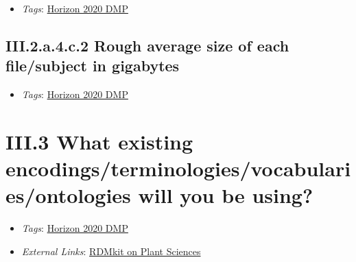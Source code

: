 \documentclass[a4paper,12pt]{report}
\begin{document}
\begin{itemize}
  \item \textit{Tags}: \ul{Horizon 2020 DMP}
  \end{itemize}




\subsection*{\protect\textcolor{colorSecId}{III.2.a.4.c.2} Rough average size of each file/subject in gigabytes}

\label{b1df3c74-0b1f-4574-81c4-4cc2d780c1af.b08fe063-33f8-4380-b3a9-ba1e586dedf2.df7ff410-748e-4704-b5b4-a06c4b269047.ba9e42fc-2bf5-413f-85de-003f981aaf81.24dbd191-2d0c-4267-b858-d9063b21a486.624cfadf-6177-47b7-9ba8-b80b68aef0fd}


\begin{itemize}
  \item \textit{Tags}: \ul{Horizon 2020 DMP}
  \end{itemize}








\section*{\protect\textcolor{colorSecId}{III.3} What existing encodings/terminologies/vocabularies/ontologies will you be using?}

\label{b1df3c74-0b1f-4574-81c4-4cc2d780c1af.2bac9020-99cf-4463-8d34-0b0eb2781cd1}


\begin{itemize}
  \item \textit{Tags}: \ul{Horizon 2020 DMP}
  
  \item \textit{External Links}: \href{https://rdmkit.elixir-europe.org/plant_sciences.html}{RDMkit on Plant Sciences}\end{itemize}
\end{document}
